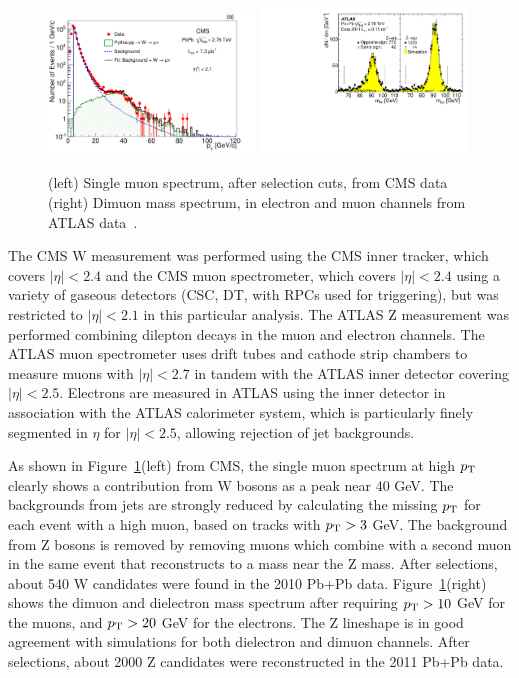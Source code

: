 \begin{figure}[!htb]
\begin{center}
\includegraphics[width=0.49\textwidth]{electroweak_figs/Fig1a.pdf}
\includegraphics[width=0.49\textwidth]{electroweak_figs/fig_01.pdf}
\caption[]{(left) Single muon spectrum, after selection cuts, from CMS data~\cite{Chatrchyan:2012nt} (right) Dimuon mass spectrum, in electron and muon channels from ATLAS data~\cite{Aad:2012ew}.}
\label{fig:pas:zw_signal}
\end{center}
\end{figure}
The CMS W measurement was performed using the CMS inner tracker, which covers $|\eta|<2.4$ 
and the CMS muon spectrometer, which covers $|\eta|<2.4$ using a variety of gaseous detectors
(CSC, DT, with RPCs used for triggering), but was restricted to $|\eta|<2.1$ in this particular analysis.
The ATLAS Z measurement was performed combining dilepton decays in the muon and electron channels.
The ATLAS muon spectrometer uses drift tubes and cathode strip chambers to measure muons with $|\eta|<2.7$
in tandem with the ATLAS inner detector covering $|\eta|<2.5$.
Electrons are measured in ATLAS using the inner detector in association with the ATLAS calorimeter system, 
which is particularly finely segmented in $\eta$ for $|\eta|<2.5$, allowing rejection of jet backgrounds.

As shown in Figure~\ref{fig:pas:zw_signal}(left) from CMS, the single muon spectrum at high $\mbox{$p_{\mathrm{T}}$}$ clearly shows a contribution
from W bosons as a peak near 40 GeV.  
The backgrounds from jets are strongly reduced by calculating the missing $\mbox{$p_{\mathrm{T}}$}$ for each event with a
high \pT muon, based on tracks with $\mbox{$p_{\mathrm{T}}$}>3$ GeV.  The background from Z bosons is removed by removing muons which
combine with a second muon in the same event that reconstructs to a mass near the Z mass.
After selections, about 540 W candidates were found in the 2010 Pb+Pb data.
%
Figure~\ref{fig:pas:zw_signal}(right) shows the dimuon and dielectron mass spectrum after requiring $\mbox{$p_{\mathrm{T}}$}>10$ GeV for
the muons, and $\mbox{$p_{\mathrm{T}}$}>20$ GeV for the electrons.  The Z lineshape is in good agreement with simulations for both
dielectron and dimuon channels.
After selections, about 2000 Z candidates were reconstructed in the 2011 Pb+Pb data.

